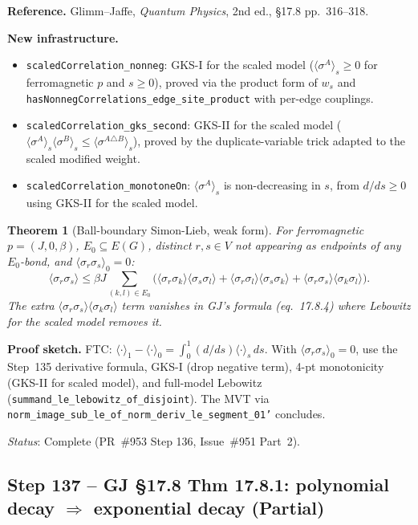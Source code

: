 \documentclass[a4paper,11pt]{article}
\newtheorem{theorem}{Theorem}
\begin{document}
\noindent\textbf{Reference.} Glimm--Jaffe, \emph{Quantum Physics}, 2nd ed., \S17.8 pp.~316--318.

\noindent\textbf{New infrastructure.}
\begin{itemize}
  \item \texttt{scaledCorrelation\_nonneg}: GKS-I for the scaled model ($\langle\sigma^A\rangle_s\ge 0$
    for ferromagnetic $p$ and $s\ge 0$), proved via the product form of $w_s$ and
    \texttt{hasNonnegCorrelations\_edge\_site\_product} with per-edge couplings.
  \item \texttt{scaledCorrelation\_gks\_second}: GKS-II for the scaled model
    ($\langle\sigma^A\rangle_s\langle\sigma^B\rangle_s\le\langle\sigma^{A\triangle B}\rangle_s$),
    proved by the duplicate-variable trick adapted to the scaled modified weight.
  \item \texttt{scaledCorrelation\_monotoneOn}: $\langle\sigma^A\rangle_s$ is non-decreasing in $s$,
    from $d/ds\ge 0$ using GKS-II for the scaled model.
\end{itemize}

\begin{theorem}[Ball-boundary Simon-Lieb, weak form]
For ferromagnetic $p=(J,0,\beta)$, $E_0\subseteq E(G)$, distinct $r,s\in V$ not appearing
as endpoints of any $E_0$-bond, and $\langle\sigma_r\sigma_s\rangle_0=0$:
\[\langle\sigma_r\sigma_s\rangle\le\beta J\sum_{(k,l)\in E_0}
  \bigl(\langle\sigma_r\sigma_k\rangle\langle\sigma_s\sigma_l\rangle
        +\langle\sigma_r\sigma_l\rangle\langle\sigma_s\sigma_k\rangle
        +\langle\sigma_r\sigma_s\rangle\langle\sigma_k\sigma_l\rangle\bigr).\]
The extra $\langle\sigma_r\sigma_s\rangle\langle\sigma_k\sigma_l\rangle$ term vanishes in GJ's
formula (eq.~17.8.4) where Lebowitz for the scaled model removes it.
\end{theorem}

\noindent\textbf{Proof sketch.}
FTC: $\langle\cdot\rangle_1-\langle\cdot\rangle_0=\int_0^1(d/ds)\langle\cdot\rangle_s\,ds$.
With $\langle\sigma_r\sigma_s\rangle_0=0$, use the Step~135 derivative formula, GKS-I (drop negative
term), 4-pt monotonicity (GKS-II for scaled model), and full-model Lebowitz
(\texttt{summand\_le\_lebowitz\_of\_disjoint}).
The MVT via \texttt{norm\_image\_sub\_le\_of\_norm\_deriv\_le\_segment\_01'} concludes.

\noindent\textit{Status}: Complete (PR~\#953 Step 136, Issue~\#951 Part~2).

\subsection*{Step 137 -- GJ \S17.8 Thm 17.8.1: polynomial decay $\Rightarrow$ exponential decay (Partial)}
\end{document}
